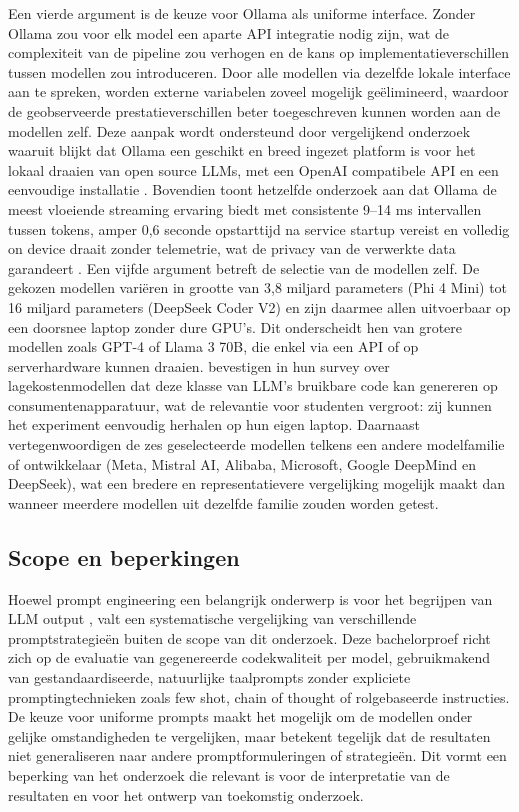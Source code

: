Een vierde argument is de keuze voor Ollama als uniforme interface. Zonder Ollama zou voor elk model een aparte API integratie nodig zijn, wat de complexiteit van de pipeline zou verhogen en de kans op implementatieverschillen tussen modellen zou introduceren. Door alle modellen via dezelfde lokale interface aan te spreken, worden externe variabelen zoveel mogelijk geëlimineerd, waardoor de geobserveerde prestatieverschillen beter toegeschreven kunnen worden aan de modellen zelf. Deze aanpak wordt ondersteund door vergelijkend onderzoek waaruit blijkt dat Ollama een geschikt en breed ingezet platform is voor het lokaal draaien van open source LLMs, met een OpenAI compatibele API en een eenvoudige installatie \autocite{Rajesh2025}. Bovendien toont hetzelfde onderzoek aan dat Ollama de meest vloeiende streaming ervaring biedt met consistente 9–14 ms intervallen tussen tokens, amper 0,6 seconde opstarttijd na service startup vereist en volledig on device draait zonder telemetrie, wat de privacy van de verwerkte data garandeert \autocite{Rajesh2025}. Een vijfde argument betreft de selectie van de modellen zelf. De gekozen modellen variëren in grootte van 3,8 miljard parameters (Phi 4 Mini) tot 16 miljard parameters (DeepSeek Coder V2) en zijn daarmee allen uitvoerbaar op een doorsnee laptop zonder dure GPU's. Dit onderscheidt hen van grotere modellen zoals GPT-4 of Llama 3 70B, die enkel via een API of op serverhardware kunnen draaien. \textcite{LopezEspejel2025} bevestigen in hun survey over lagekostenmodellen dat deze klasse van LLM's bruikbare code kan genereren op consumentenapparatuur, wat de relevantie voor studenten vergroot: zij kunnen het experiment eenvoudig herhalen op hun eigen laptop. Daarnaast vertegenwoordigen de zes geselecteerde modellen telkens een andere modelfamilie of ontwikkelaar (Meta, Mistral AI, Alibaba, Microsoft, Google DeepMind en DeepSeek), wat een bredere en representatievere vergelijking mogelijk maakt dan wanneer meerdere modellen uit dezelfde familie zouden worden getest.

\subsection{Scope en beperkingen}

Hoewel prompt engineering een belangrijk onderwerp is voor het begrijpen van LLM output \autocite{Guo2024,Yuen2025}, valt een systematische vergelijking van verschillende promptstrategieën buiten de scope van dit onderzoek. Deze bachelorproef richt zich op de evaluatie van gegenereerde codekwaliteit per model, gebruikmakend van gestandaardiseerde, natuurlijke taalprompts zonder expliciete promptingtechnieken zoals few shot, chain of thought of rolgebaseerde instructies. De keuze voor uniforme prompts maakt het mogelijk om de modellen onder gelijke omstandigheden te vergelijken, maar betekent tegelijk dat de resultaten niet generaliseren naar andere promptformuleringen of strategieën. Dit vormt een beperking van het onderzoek die relevant is voor de interpretatie van de resultaten en voor het ontwerp van toekomstig onderzoek.

